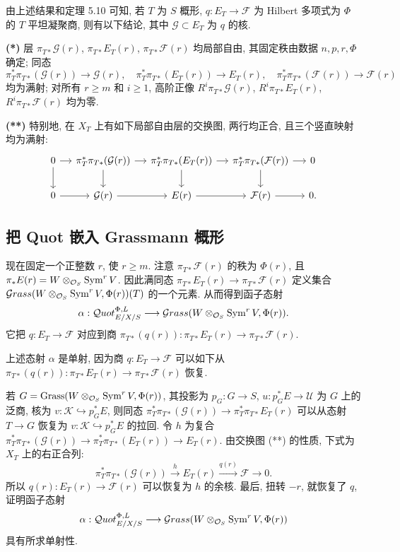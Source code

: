 由上述结果和定理 5.10 可知, 若 $T$ 为 $S$ 概形, $q:E_T\to\mathcal F$ 为 Hilbert 多项式为 $\Phi$ 的 $T$ 平坦凝聚商, 则有以下结论, 其中 $\mathcal G\subset E_T$ 为 $q$ 的核.

\textbf{(*)} 层 $\pi_{T*}\mathcal G(r)$, $\pi_{T*}E_T(r)$, $\pi_{T*}\mathcal F(r)$ 均局部自由, 其固定秩由数据 $n,p,r,\Phi$ 确定; 同态
\[
 \pi_T^*\pi_{T*}(\mathcal G(r))\to\mathcal G(r),\quad
 \pi_T^*\pi_{T*}(E_T(r))\to E_T(r),\quad
 \pi_T^*\pi_{T*}(\mathcal F(r))\to\mathcal F(r)
\]
均为满射; 对所有 $r\geq m$ 和 $i\geq1$, 高阶正像 $R^i\pi_{T*}\mathcal G(r)$, $R^i\pi_{T*}E_T(r)$, $R^i\pi_{T*}\mathcal F(r)$ 均为零.

\textbf{(**)} 特别地, 在 $X_T$ 上有如下局部自由层的交换图, 两行均正合, 且三个竖直映射均为满射:
\[
\begin{tikzcd}[column sep=small]
0\arrow[r]\arrow[d]&\pi_T^*\pi_{T*}(\mathcal G(r))\arrow[r]\arrow[d]
 &\pi_T^*\pi_{T*}(E_T(r))\arrow[r]\arrow[d]
 &\pi_T^*\pi_{T*}(\mathcal F(r))\arrow[r]\arrow[d]&0\\
0\arrow[r]&\mathcal G(r)\arrow[r]&E(r)\arrow[r]&\mathcal F(r)\arrow[r]&0.
\end{tikzcd}
\]

\subsection{把 Quot 嵌入 Grassmann 概形}\label{ch05:sec5.5.5}
现在固定一个正整数 $r$, 使 $r\geq m$. 注意 $\pi_{T*}\mathcal F(r)$ 的秩为 $\Phi(r)$, 且 $\pi_*E(r)=W\otimes_{\mathcal O_S}\operatorname{Sym}^rV$. 因此满同态 $\pi_{T*}E_T(r)\to\pi_{T*}\mathcal F(r)$ 定义集合 $\mathcal{G}rass(W\otimes_{\mathcal O_S}\operatorname{Sym}^rV,\Phi(r))(T)$ 的一个元素. 从而得到函子态射
\[
 \alpha:\mathcal{Q}uot^{\Phi,L}_{E/X/S}\longrightarrow\mathcal{G}rass(W\otimes_{\mathcal O_S}\operatorname{Sym}^rV,\Phi(r)).
\]
它把 $q:E_T\to\mathcal F$ 对应到商 $\pi_{T*}(q(r)):\pi_{T*}E_T(r)\to\pi_{T*}\mathcal F(r)$.

上述态射 $\alpha$ 是单射, 因为商 $q:E_T\to\mathcal F$ 可以如下从 $\pi_{T*}(q(r)):\pi_{T*}E_T(r)\to\pi_{T*}\mathcal F(r)$ 恢复.

若 $G=\operatorname{Grass}(W\otimes_{\mathcal O_S}\operatorname{Sym}^rV,\Phi(r))$, 其投影为 $p_G:G\to S$, $u:p_G^*E\to\mathcal U$ 为 $G$ 上的泛商, 核为 $v:\mathcal K\hookrightarrow p_G^*E$, 则同态 $\pi_T^*\pi_{T*}(\mathcal G(r))\to\pi_T^*\pi_{T*}E_T(r)$ 可以从态射 $T\to G$ 恢复为 $v:\mathcal K\hookrightarrow p_G^*E$ 的拉回. 令 $h$ 为复合 $\pi_T^*\pi_{T*}(\mathcal G(r))\to\pi_T^*\pi_{T*}(E_T(r))\to E_T(r)$. 由交换图 (**) 的性质, 下式为 $X_T$ 上的右正合列:
\[
 \pi_T^*\pi_{T*}(\mathcal G(r))\xrightarrow{h}E_T(r)\xrightarrow{q(r)}\mathcal F\longrightarrow0.
\]
所以 $q(r):E_T(r)\to\mathcal F(r)$ 可以恢复为 $h$ 的余核. 最后, 扭转 $-r$, 就恢复了 $q$, 证明函子态射
\[
 \alpha:\mathcal{Q}uot^{\Phi,L}_{E/X/S}\longrightarrow\mathcal{G}rass(W\otimes_{\mathcal O_S}\operatorname{Sym}^rV,\Phi(r))
\]
具有所求单射性.

